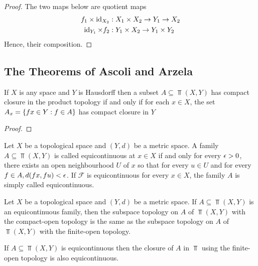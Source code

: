 \documentclass{article}
\begin{document}
\begin{proof}
    The two maps below are quotient maps
    \begin{align*}
        f_1 \times \operatorname{id}_{X_2}&: X_1 \times X_2 \to Y_1 \to X_2 \\
        \operatorname{id}_{Y_1} \times f_2&: Y_1 \times X_2 \to Y_1 \times Y_2
    \end{align*}
    Hence, their composition.
\end{proof}

\subsection{The Theorems of Ascoli and Arzela}


\begin{theorem}
    If $X$ is any space and $Y$ is Hausdorff then a subset $A \subseteq \Top(X, Y)$ has compact closure in the product topology if and only if for each $x \in X$, the set $A_x = \{fx \in Y: f \in A\}$ has compact closure in $Y$
\end{theorem}

\begin{proof}
\end{proof}

\begin{definition}[equicontinuous]
    Let $X$ be a topological space and $(Y, d)$ be a metric space. A family $A \subseteq \Top(X, Y)$ is called equicontinuous at $x \in X$ if and only for every $\epsilon > 0$, there exists an open neighbourhood $U$ of $x$ so that for every $u \in U$ and for every $f \in A, d(fx, fu) < \epsilon$. If $\mathcal{F}$ is equicontinuous for every $x \in X$, the family $A$ is simply called equicontinuous.
\end{definition}

\begin{lemma}
    Let $X$ be a topological space and $(Y, d)$ be a metric space. If $A \subseteq \Top(X, Y)$ is an equicontinuous family, then the subspace topology on $A$ of $\Top(X, Y)$ with the compact-open topology is the same as the subspace topology on $A$ of $\Top(X, Y)$ with the finite-open topology.
\end{lemma}

\begin{lemma}
    If $A \subseteq \Top(X, Y)$ is equicontinuous then the closure of $A$ in $\Top$ using the finite-open topology is also equicontinuous.
\end{lemma}
\end{document}
